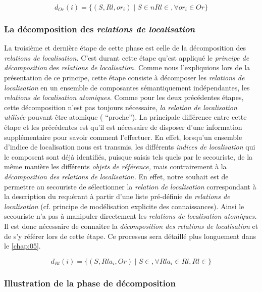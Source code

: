 \begin{equation}
  d_{Or}(i) = \{(S,Rl,or_i) \mid S \in n Rl \in , \forall or_i \in Or \} 
\end{equation}

\subsubsection{La décomposition des \emph{relations de localisation}}

La troisième et dernière étape de cette phase est celle de la
décomposition des \emph{relations de localisation.} C'est durant cette
étape qu'est appliqué le \emph{principe de décomposition} des
\emph{relations de localisation.} Comme nous l'expliquions lors de la
présentation de ce principe, cette étape consiste à décomposer les
\emph{relations de localisation} en un ensemble de composantes
sémantiquement indépendantes, les \emph{relations de localisation
  atomiques.} Comme pour les deux précédentes étapes, cette
décomposition n'est pas toujours nécessaire, \emph{la relation de
  localisation utilisée} pouvant être atomique (\eg
\enquote{proche}). La principale différence entre cette étape et les
précédentes est qu'il est nécessaire de disposer d'une information
supplémentaire pour savoir comment l'effectuer. En effet, lorsqu'un
ensemble d'indice de localisation nous est transmis, les différents
\emph{indices de localisation} qui le composent sont déjà identifiés,
puisque saisis tels quels par le secouriste, de la même manière les
différents \emph{objets de référence,} mais contrairement à la
\emph{décomposition des relations de localisation.} En effet, notre
souhait est de permettre au secouriste de sélectionner la
\emph{relation de localisation} correspondant à la description du
requérant à partir d'une liste pré-définie de \emph{relations de
  localisation} (cf. principe de modélisation explicite des
connaissances). Ainsi le secouriste n'a pas à manipuler directement
les \emph{relations de localisation atomiques.} Il est donc nécessaire
de connaitre la \emph{décomposition des relations de localisation} et
de s'y référer lors de cette étape. Ce processus sera détaillé plus
longuement dans le \autoref{chap:05}.

\begin{equation}
  d_{Rl}(i) = \{(S,Rla_i,Or) \mid S \in, \forall Rla_i \in Rl,  Rl \in  \} 
\end{equation}

\subsubsection{Illustration de la phase de décomposition}

